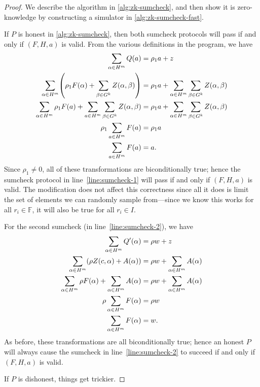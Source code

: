 \documentclass[english,12pt]{reedthesis}
\theoremstyle{plain}
\theoremstyle{definition}
\theoremstyle{remark}
\begin{document}
\begin{proof}
  We describe the algorithm in \cref{alg:zk-sumcheck}, and then show it is
  zero-knowledge by constructing a simulator in \cref{alg:zk-sumcheck-fast}.

  If $P$ is honest in \cref{alg:zk-sumcheck}, then both sumcheck protocols will
  pass if and only if $(F, H, a)$ is valid. From the various definitions in the
  program, we have
  \begin{align*}
    \sum_{\alpha \in H^{m}}Q(a) &= \rho_{1}a + z \\
    \sum_{\alpha \in H^{m}}\mleft(\rho_{1}F(\alpha) + \sum_{\beta \in G^{k}}Z(\alpha, \beta)\mright) &= \rho_{1}a + \sum_{\alpha \in H^{m}}\sum_{\beta \in G^{k}}Z(\alpha, \beta) \\
    \sum_{\alpha \in H^{m}}\rho_{1}F(a) + \sum_{a \in H^{m}}\sum_{\beta \in G^{k}}Z(\alpha, \beta) &= \rho_{1}a + \sum_{\alpha \in H^{m}}\sum_{\beta \in G^{k}}Z(\alpha, \beta) \\
    \rho_{1}\sum_{a \in H^{m}}F(a) &= \rho_{1}a \\
    \sum_{a \in H^{m}}F(a) &= a.
  \end{align*}
  Since $\rho_{1} \ne 0$, all of these transformations are biconditionally true;
  hence the sumcheck protocol in line~\ref{line:sumcheck-1} will pass if and
  only if $(F, H, a)$ is valid. The modification does not affect this
  correctness since all it does is limit the set of elements we can randomly
  sample from---since we know this works for all $r_{i} \in \mathbb{F}$, it will
  also be true for all $r_{i} \in I$.

  For the second sumcheck (in line~\ref{line:sumcheck-2}), we have
  \begin{align*}
    \sum_{\alpha \in H^{m}}Q'(\alpha) &= \rho w + z \\
    \sum_{\alpha \in H^{m}}\mleft(\rho Z(c, \alpha) + A(\alpha)\mright) &= \rho w + \sum_{\alpha \in H^{m}}A(\alpha) \\
    \sum_{\alpha \in H^{m}}\rho F(\alpha) + \sum_{\alpha \in H^{m}}A(\alpha) &= \rho w + \sum_{\alpha \in H^{m}}A(\alpha) \\
    \rho\sum_{\alpha \in H^{m}}F(\alpha) &= \rho w \\
    \sum_{\alpha \in H^{m}}F(\alpha) &= w.
  \end{align*}
  As before, these transformations are all biconditionally true; hence an honest
  $P$ will always cause the sumcheck in line~\ref{line:sumcheck-2} to succeed if
  and only if $(F, H, a)$ is valid.

  If $P$ is dishonest, things get trickier.
\end{proof}
\end{document}

